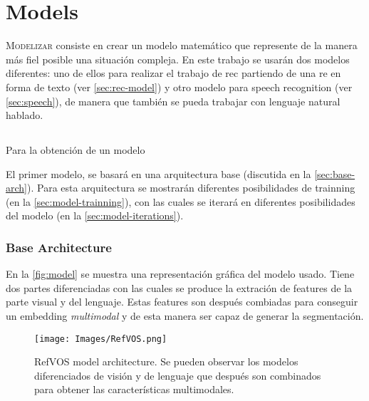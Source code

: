 

\chapter{Models} \label{cha:model}



\lettrine{M}{odelizar} consiste en crear un modelo matemático que represente de
la manera más fiel posible una situación compleja. En este trabajo se usarán
dos modelos diferentes: uno de ellos para realizar el trabajo de \gls{rec}
partiendo de una \gls{re} en forma de texto (ver \vref{sec:rec-model}) y otro
modelo para speech recognition (ver \vref{sec:speech}), de manera que también
se pueda trabajar con lenguaje natural hablado.


\section{}\label{sec:rec-model}

Para la obtención de un modelo

El primer modelo, se basará en una arquitectura base (discutida en la
\vref{sec:base-arch}). Para esta arquitectura se mostrarán diferentes
posibilidades de trainning (en la \vref{sec:model-trainning}), con las
cuales se iterará en diferentes posibilidades del modelo (en la
\vref{sec:model-iterations}).

\subsection{Base Architecture} \label{sec:base-arch}

En la \vref{fig:model} se muestra una representación gráfica del modelo
usado. Tiene dos partes diferenciadas con las cuales se produce la extración de
features de la parte visual y del lenguaje. Estas features son después
combiadas para conseguir un embedding \emph{multimodal} y de esta manera ser
capaz de generar la segmentación.

\begin{figure}[htb]
  \centering
  \texttt{[image: Images/RefVOS.png]}
  \caption[RefVOS model architecture]{RefVOS model architecture. Se pueden
    observar los modelos diferenciados de visión y de lenguaje que después son
    combinados para obtener las características multimodales.}
  \label{fig:model}
\end{figure}

